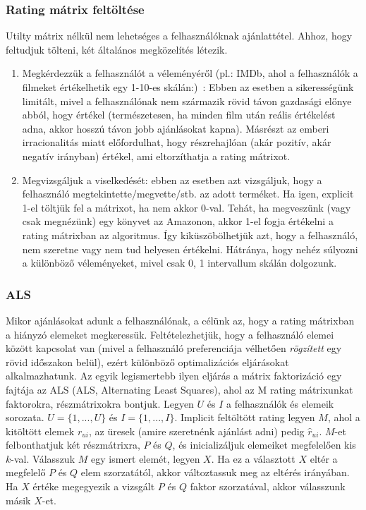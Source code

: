 \documentclass[a4paper,12pt]{article}
\begin{document}
\subsubsection{Rating mátrix feltöltése}
Utilty mátrix nélkül nem lehetséges a felhasználóknak ajánlattétel. Ahhoz, hogy feltudjuk tölteni, két általános megközelítés létezik.
\begin{enumerate}
\item Megkérdezzük a felhasználót a véleményéről (pl.: IMDb, ahol a felhasználók a filmeket értékelhetik egy 1-10-es skálán:)~\cite{imdb}: Ebben az esetben a sikerességünk limitált, mivel a felhasználónak nem származik rövid távon gazdasági előnye abból, hogy értékel (természetesen, ha minden film után reális értékelést adna, akkor hosszú távon jobb ajánlásokat kapna). Másrészt az emberi irracionalitás miatt előfordulhat, hogy részrehajlóan (akár pozitív, akár negatív irányban) értékel, ami eltorzíthatja a rating mátrixot. ~\cite{introspection}
\item Megvizsgáljuk a viselkedését: ebben az esetben azt vizsgáljuk, hogy a felhasználó megtekintette/megvette/stb. az adott terméket. Ha igen, explicit 1-el töltjük fel a mátrixot, ha nem akkor 0-val. Tehát, ha megveszünk (vagy csak megnézünk) egy könyvet az Amazonon, akkor 1-el fogja értékelni a rating mátrixban az algoritmus. Így kiküszöbölhetjük azt, hogy a felhasználó, nem szeretne vagy nem tud helyesen értékelni. Hátránya, hogy nehéz súlyozni a különböző véleményeket, mivel csak {0, 1} intervallum skálán dolgozunk.
\end{enumerate}

\subsubsection{ALS}
Mikor ajánlásokat adunk a felhasználónak, a célünk az, hogy a rating mátrixban a hiányzó elemeket megkeressük. Feltételezhetjük, hogy a felhasználó elemei között kapcsolat van (mivel a felhasználó preferenciája vélhetően \textsl{rögzített} egy rövid időszakon belül), ezért különböző optimalizációs eljárásokat alkalmazhatunk. Az egyik legismertebb ilyen eljárás a mátrix faktorizáció egy fajtája az ALS (ALS, Alternating Least Squares), ahol az M rating mátrixunkat faktorokra, részmátrixokra bontjuk. \linebreak
Legyen $U$ és $I$ a felhasználók és elemeik sorozata. $U={\{1, ..., U\}}$ és $I={\{1, ..., I\}}$.  Implicit feltöltött rating legyen $M$, ahol a kitöltött elemek $r_{ui}$, az üresek (amire szeretnénk ajánlást adni) pedig $\hat{r}_{ui}$. $M$-et felbonthatjuk két részmátrixra, $P$ és $Q$, és inicializáljuk elemeiket megfelelően kis $k$-val. Válasszuk $M$ egy ismert elemét, legyen $X$. Ha ez a választott $X$ eltér a megfelelő $P$ és $Q$ elem szorzatától, akkor változtassuk meg az eltérés irányában. Ha $X$ értéke megegyezik a vizsgált $P$ és $Q$ faktor szorzatával, akkor válasszunk másik $X$-et.
\end{document}
